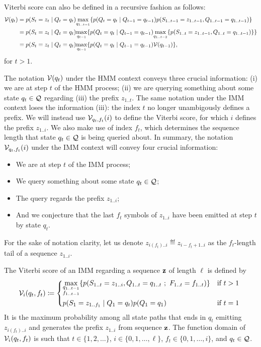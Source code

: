 Viterbi score can also be defined in a recursive fashion as follows:
\begin{equation*}
\begin{split}
  \mathcal{V}(q_t)
  &= p(S_t=z_t \;|\; Q_t=q_t) \underset{q_{1..t-1}}{\max}
    \{ p(Q_t=q_t \;|\; Q_{t-1}=q_{t-1}) p(S_{1..t-1}=z_{1..t-1}, Q_{1..t-1}=q_{1..t-1}) \} \\
  &= p(S_t=z_t \;|\; Q_t=q_t) \underset{q_{t-1}}{\max}
    \{ p(Q_t=q_t \;|\; Q_{t-1}=q_{t-1})
    \underset{q_{1..t-2}}{\max} \{ p(S_{1..t}=z_{1..t-1}, Q_{1..t}=q_{1..t-1}) \} \} \\
  &= p(S_t=z_t \;|\; Q_t=q_t) \underset{q_{t-1}}{\max} \{ p(Q_t=q_t \;|\; Q_{t-1}=q_{t-1})
    \mathcal{V}(q_{t-1}) \},
\end{split}
\end{equation*}
for $t>1$.

The notation $\mathcal{V}(q_t)$ under the HMM context conveys three crucial information: (i) we are at
step $t$ of the HMM process; (ii) we are querying something about some state $q_t \in \mathcal{Q}$
regarding (iii) the prefix $z_{1..t}$. The same notation under the IMM context loses the information
(iii): the index $t$ no longer unambigously defines a prefix. We will instead use
$\mathcal{V}_{q_t,f_t}(i)$ to define the Viterbi score, for which $i$ defines the prefix $z_{1..i}$. We
also make use of index $f_t$, which determines the sequence length that state $q_t \in \mathcal{Q}$ is
being queried about.
In summary, the notation $\mathcal{V}_{q_t,f_t}(i)$ under the IMM context will convey four crucial
information:
\begin{itemize}
  \item We are at step $t$ of the IMM process;
  \item We query something about some state $q_t \in \mathcal{Q}$;
  \item The query regards the prefix $z_{1..i}$;
  \item And we conjecture that the last $f_t$ symbols of $z_{1..i}$ have been emitted at step $t$ by
    state $q_t$.
\end{itemize}
For the sake of notation clarity, let us denote $z_{i(f_t)..i} \eqdef z_{i-f_t+1..i}$ as the
$f_t$-length tail of a sequence $z_{1..i}$.

The Viterbi score of an IMM regarding a sequence $\mathbf{z}$ of length $\ell$ is defined by
\begin{equation*}
  \viterbi_{i}(q_t,f_t) \eqdef
  \begin{dcases*}
    \umax{\substack{q_{1..t-1}\\f_{1..t-1}}}
    \{
      p(S_{1..t}=z_{1..i}, Q_{1..t}=q_{1..t} ~;~ F_{1..t}=f_{1..t})
    \}                                                                  & if $t>1$\\
    p(S_1=z_{1..f_1} \gv Q_1=q_t) p(Q_1=q_1)                            & if $t=1$
  \end{dcases*}
\end{equation*}
It is the maximum probability among all state paths that ends in
$q_t$ emitting $z_{i(f_t)..i}$ and generates the prefix $z_{1..i}$ from sequence $\mathbf{z}$.
The function domain of $\mathcal{V}_{i}(q_t,f_t)$ is such that $t \in \{1, 2, \dots\}$, $i \in \{0, 1,
\dots, \ell\}$, $f_t \in \{0, 1, \dots, i\}$, and $q_t \in \mathcal{Q}$.

